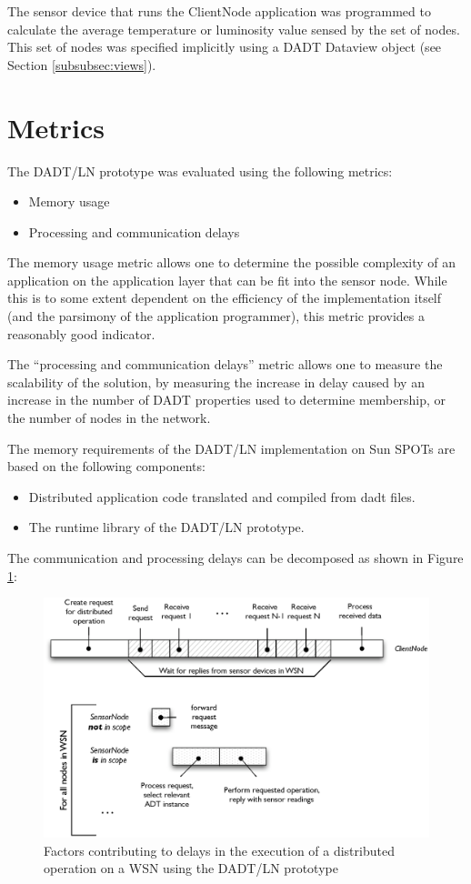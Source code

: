 The sensor device that runs the ClientNode application was programmed to 
calculate the average temperature or luminosity value sensed by the set of
nodes. This set of nodes was specified implicitly using a DADT Dataview object
(see Section \ref{subsubsec:views}).


\section{Metrics}

The DADT/LN prototype was evaluated using the following metrics:
\begin{itemize}
\item Memory usage
\item Processing and communication delays
\end{itemize} 

The memory usage metric allows one to determine the possible complexity of an
application on the application layer that can be fit into the sensor node. While
this is to some extent dependent on the efficiency of the implementation itself
(and the parsimony of the application programmer), this metric provides a
reasonably good indicator.

The ``processing and communication delays'' metric allows one to measure the
scalability of the solution, by measuring the increase in delay caused by an
increase in the number of DADT properties used to determine membership, or the
number of nodes in the network.

The memory requirements of the DADT/LN implementation on Sun SPOTs are
based on the following components:
\begin{itemize}
  \item Distributed application code translated and compiled from dadt files.
  \item The runtime library of the DADT/LN prototype.
\end{itemize}

The communication and processing delays can be decomposed as shown in Figure \ref{Fig:TimingsModel}:

\begin{figure}
\centering
\includegraphics[scale=0.60]{img/RTTevaluation.eps} 
\caption[Delay factors for distributed operation execution]{Factors contributing to delays in the execution of a distributed operation on a WSN using the DADT/LN prototype}
\label{Fig:TimingsModel}
\end{figure}

